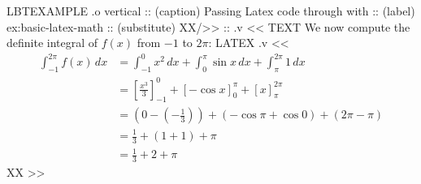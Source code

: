 \begin{lbt}
    LBTEXAMPLE .o vertical
    :: (caption) Passing Latex code through with 
    :: (label) ex:basic-latex-math
    :: (substitute) XX/>>
    :: .v <<
      TEXT We now compute the definite integral of $f(x)$ from $-1$ to $2\pi$:
      LATEX .v <<
        \begin{align*}
        \int_{-1}^{2\pi} f(x)\,dx
        &= \int_{-1}^{0} x^2\,dx
          + \int_{0}^{\pi} \sin x\,dx
          + \int_{\pi}^{2\pi} 1\,dx \\
        &= \left[\frac{x^3}{3}\right]_{-1}^{0}
          + \left[-\cos x\right]_{0}^{\pi}
          + \left[x\right]_{\pi}^{2\pi} \\
        &= \left(0 - \left(-\frac{1}{3}\right)\right)
          + \left(-\cos \pi + \cos 0\right)
          + \left(2\pi - \pi\right) \\
        &= \frac{1}{3} + (1 + 1) + \pi \\
        &= \frac{1}{3} + 2 + \pi
        \end{align*}
      XX
    >>






\end{lbt}
